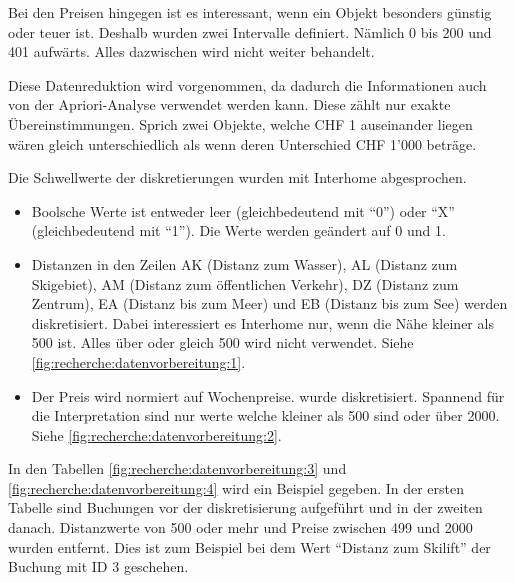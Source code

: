 Bei den Preisen hingegen ist es interessant, wenn ein Objekt besonders günstig oder teuer ist. Deshalb wurden zwei Intervalle definiert. Nämlich 0 bis 200 und 401 aufwärts. Alles dazwischen wird nicht weiter behandelt.

Diese Datenreduktion wird vorgenommen, da dadurch die Informationen auch von der Apriori-Analyse verwendet werden kann. Diese zählt nur exakte Übereinstimmungen. Sprich zwei Objekte, welche CHF 1 auseinander liegen wären gleich unterschiedlich als wenn deren Unterschied CHF 1'000 beträge.

Die Schwellwerte der diskretierungen wurden mit Interhome abgesprochen.

\begin{itemize}
\item Boolsche Werte ist entweder leer (gleichbedeutend mit "`0"') oder "`X"' (gleichbedeutend mit "`1"'). Die Werte werden geändert auf 0 und 1.
\item Distanzen in den Zeilen AK (Distanz zum Wasser), AL (Distanz zum Skigebiet), AM (Distanz zum öffentlichen Verkehr), DZ (Distanz zum Zentrum), EA (Distanz bis zum Meer) und EB (Distanz bis zum See) werden diskretisiert. Dabei interessiert es Interhome nur, wenn die Nähe kleiner als 500 ist. Alles über oder gleich 500 wird nicht verwendet. Siehe \cref{fig:recherche:datenvorbereitung:1}.
\item Der Preis wird normiert auf Wochenpreise. wurde diskretisiert. Spannend für die Interpretation sind nur werte welche kleiner als 500 sind oder über 2000. Siehe \cref{fig:recherche:datenvorbereitung:2}.
\end{itemize}

In den Tabellen \ref{fig:recherche:datenvorbereitung:3} und \ref{fig:recherche:datenvorbereitung:4} wird ein Beispiel gegeben. In der ersten Tabelle sind Buchungen vor der diskretisierung aufgeführt und in der zweiten danach. Distanzwerte von 500 oder mehr und Preise zwischen 499 und 2000 wurden entfernt. Dies ist zum Beispiel bei dem Wert "`Distanz zum Skilift"' der Buchung mit ID 3 geschehen.

